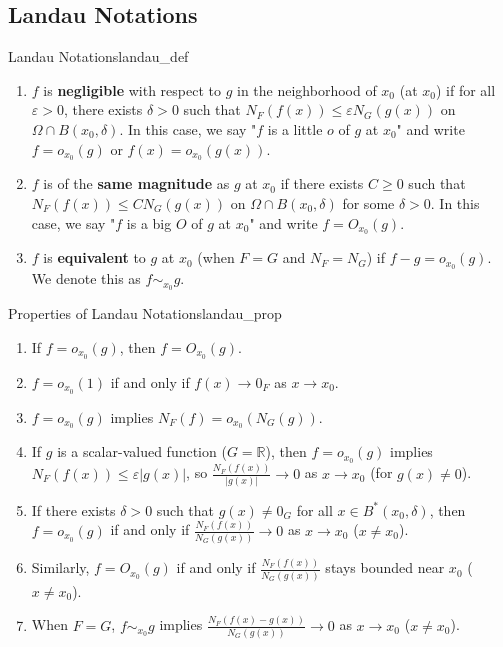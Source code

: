 \documentclass[11pt, a4paper]{article}
\newcommand{\R}{\mathbb{R}}
\newcommand{\eps}{\varepsilon}
\begin{document}
\subsection{Landau Notations}
\begin{definition}{Landau Notations}{landau_def}
\begin{enumerate}
    \item $f$ is \textbf{negligible} with respect to $g$ in the neighborhood of $x_0$ (at $x_0$) if for all $\eps > 0$, there exists $\delta > 0$ such that $N_F(f(x)) \le \eps N_G(g(x))$ on $\Omega \cap B(x_0, \delta)$.
    In this case, we say "$f$ is a little $o$ of $g$ at $x_0$" and write $f = o_{x_0}(g)$ or $f(x) = o_{x_0}(g(x))$.
    \item $f$ is of the \textbf{same magnitude} as $g$ at $x_0$ if there exists $C \ge 0$ such that $N_F(f(x)) \le C N_G(g(x))$ on $\Omega \cap B(x_0, \delta)$ for some $\delta > 0$.
    In this case, we say "$f$ is a big $O$ of $g$ at $x_0$" and write $f = O_{x_0}(g)$.
    \item $f$ is \textbf{equivalent} to $g$ at $x_0$ (when $F=G$ and $N_F = N_G$) if $f - g = o_{x_0}(g)$. We denote this as $f \sim_{x_0} g$.
\end{enumerate}
\end{definition}

\begin{remark}{Properties of Landau Notations}{landau_prop}
\begin{enumerate}
    \item If $f = o_{x_0}(g)$, then $f = O_{x_0}(g)$.
    \item $f = o_{x_0}(1)$ if and only if $f(x) \to 0_F$ as $x \to x_0$.
    \item $f = o_{x_0}(g)$ implies $N_F(f) = o_{x_0}(N_G(g))$.
    \item If $g$ is a scalar-valued function ($G=\R$), then $f = o_{x_0}(g)$ implies $N_F(f(x)) \le \eps |g(x)|$, so $\frac{N_F(f(x))}{|g(x)|} \to 0$ as $x \to x_0$ (for $g(x) \neq 0$).
    \item If there exists $\delta > 0$ such that $g(x) \neq 0_G$ for all $x \in B^*(x_0, \delta)$, then $f = o_{x_0}(g)$ if and only if $\frac{N_F(f(x))}{N_G(g(x))} \to 0$ as $x \to x_0$ ($x \neq x_0$).
    \item Similarly, $f = O_{x_0}(g)$ if and only if $\frac{N_F(f(x))}{N_G(g(x))}$ stays bounded near $x_0$ ($x \neq x_0$).
    \item When $F=G$, $f \sim_{x_0} g$ implies $\frac{N_F(f(x) - g(x))}{N_G(g(x))} \to 0$ as $x \to x_0$ ($x \neq x_0$).
\end{enumerate}
\end{remark}
\end{document}
